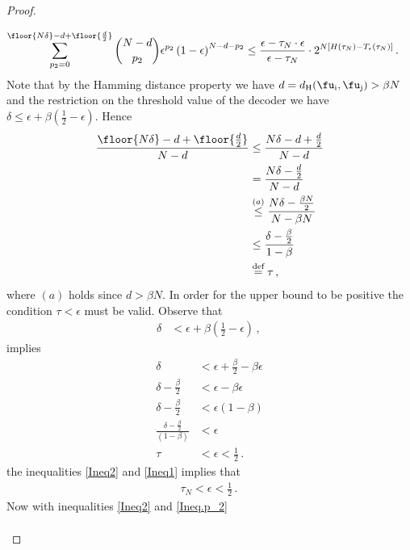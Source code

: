 \begin{proof}
\begin{itemize}
\begin{enumerate}
\begin{align}
       \label{Ineq.p_2}
        \sum_{p_2=0}^{\floor{N\delta}-d+\floor{\frac{d}{2}}} \binom{N-d}{p_2}\epsilon^{p_2} \left(1-\epsilon\right)^{N-d-p_2} & \leq \frac{\epsilon-\tau_N \cdot\epsilon}{\epsilon - \tau_N} \cdot 2^{N\left[H(\tau_N)-T_{\epsilon}(\tau_N)\right]}\,.\,
    \end{align}
Note that by the Hamming distance property we have $d=d_{\text{H}}(\fu_\text{i},\fu_\text{j}) > \beta N$ and the restriction on the threshold value of the decoder we have $\delta \leq \epsilon+\beta(\frac{1}{2}-\epsilon)$. Hence 
\begin{align}
\label{Ineq2}
 \frac{\floor{N\delta}-d+\floor{\frac{d}{2}}}{N-d} & \leq \frac{N\delta-d+\frac{d}{2}}{N-d}
 \nonumber\\
 & = \frac{N\delta-\frac{d}{2}}{N-d}
 \nonumber\\
 & \stackrel{(a)}{\leq} \frac{N\delta-\frac{\beta N}{2}}{N-\beta N}
 \nonumber\\
 & \leq \frac{\delta-\frac{\beta }{2}}{1-\beta}
 \nonumber\\
 & \overset{\text{def}}{=} \tau
  \,,\,
\end{align}
where $(a)$ holds since $d > \beta N$.
In order for the upper bound to be positive the condition $\tau < \epsilon$ must be valid. Observe that 
\begin{align}
    \delta &< \epsilon+\beta(\frac{1}{2}-\epsilon)\,,\,
    \nonumber
\end{align}
implies
\begin{align}
\label{Ineq1}
   \delta &< \epsilon+\frac{\beta}{2} -\beta \epsilon
   \nonumber\\
   \delta - \frac{\beta}{2} &< \epsilon -\beta \epsilon
   \nonumber\\
     \delta - \frac{\beta}{2} &< \epsilon (1 -\beta)
    \nonumber\\
     \frac{\delta - \frac{\beta}{2}}{(1 -\beta)}&< \epsilon 
      \nonumber\\
     \tau &< \epsilon  < \frac{1}{2}\,.\,
\end{align}
the inequalities \eqref{Ineq2} and \eqref{Ineq1} implies that 
\begin{align}
    \tau_N < \epsilon < \frac{1}{2}\,.\,
\end{align}
Now with inequalities \eqref{Ineq2} and \eqref{Ineq.p_2} 
 \begin{align}
 \label{prooftype2}

\end{align}
\end{enumerate}
\end{itemize}
\end{proof}
